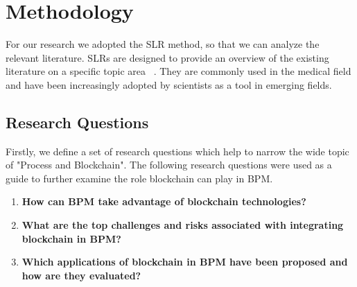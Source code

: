 \section{Methodology}
For our research we adopted the SLR method, so that we can analyze the relevant literature. SLRs are designed to provide an overview of the existing literature on a specific topic area ~\cite{frizzo-barker_blockchain_2020}. They are commonly used in the medical field and have been increasingly adopted by scientists as a tool in emerging fields.

\subsection{Research Questions}
Firstly, we define a set of research questions which help to narrow the wide topic of "Process and Blockchain". The following research questions were used as a guide to further examine the role blockchain can play in BPM.
\begin{enumerate}
    \item \textbf{How can BPM take advantage of blockchain technologies?} 
    
    
    \item \textbf{What are the top challenges and risks associated with integrating blockchain in BPM?}
    
    
    \item \textbf{Which applications of blockchain in BPM have been proposed and how are they evaluated?}

\end{enumerate}

